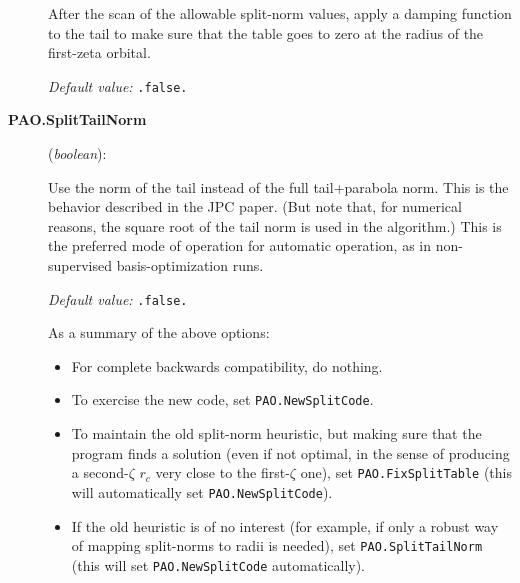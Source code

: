 \documentclass[11pt]{article}
\begin{document}
\begin{description}
After the scan of the allowable split-norm values, apply a damping
function to the tail to make sure that the table goes to zero at
the radius of the first-zeta orbital.

{\it Default value:} {\tt .false.}

\item[{\bf PAO.SplitTailNorm}] ({\it boolean}): 

Use the norm of the tail instead of the full tail+parabola
norm. This is the behavior described in the JPC paper. (But note
that, for numerical reasons, the square root of the tail norm is used
in the algorithm.) This is the preferred mode of operation for
automatic operation, as in non-supervised basis-optimization runs.

{\it Default value:} {\tt .false.}

As a summary of the above options:
\begin{itemize}
\item For complete backwards compatibility, do nothing.
\item To exercise the new code, set {\tt PAO.NewSplitCode}.
\item To maintain the old split-norm heuristic, but
making sure that the program finds a solution (even
if not optimal, in the sense of producing a second-$\zeta$ $r_c$
very close to the first-$\zeta$ one), set {\tt PAO.FixSplitTable}
(this will automatically set {\tt PAO.NewSplitCode}).
\item If the old heuristic is of no interest (for example, if
only a robust way of mapping split-norms to radii is needed), set
{\tt PAO.SplitTailNorm} (this will set {\tt PAO.NewSplitCode}
automatically).
\end{itemize}

\end{description}
\end{document}
